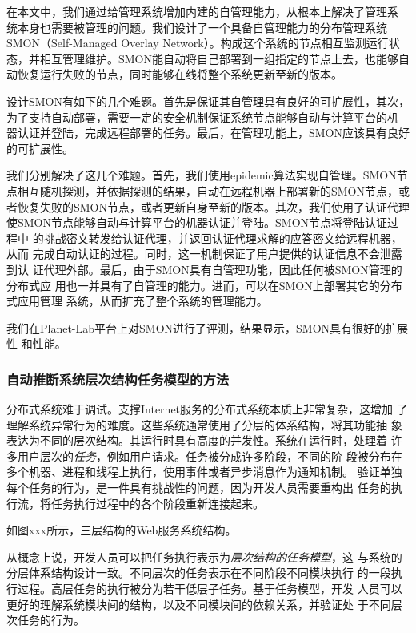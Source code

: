 在本文中，我们通过给管理系统增加内建的自管理能力，从根本上解决了管理系
统本身也需要被管理的问题。我们设计了一个具备自管理能力的分布管理系统
SMON（Self-Managed Overlay Network）。构成这个系统的节点相互监测运行状
态，并相互管理维护。SMON能自动将自己部署到一组指定的节点上去，也能够自
动恢复运行失败的节点，同时能够在线将整个系统更新至新的版本。

设计SMON有如下的几个难题。首先是保证其自管理具有良好的可扩展性，其次，
为了支持自动部署，需要一定的安全机制保证系统节点能够自动与计算平台的机
器认证并登陆，完成远程部署的任务。最后，在管理功能上，SMON应该具有良好
的可扩展性。

我们分别解决了这几个难题。首先，我们使用epidemic算法实现自管理。SMON节
点相互随机探测，并依据探测的结果，自动在远程机器上部署新的SMON节点，或
者恢复失败的SMON节点，或者更新自身至新的版本。其次，我们使用了认证代理
使SMON节点能够自动与计算平台的机器认证并登陆。SMON节点将登陆认证过程中
的挑战密文转发给认证代理，并返回认证代理求解的应答密文给远程机器，从而
完成自动认证的过程。同时，这一机制保证了用户提供的认证信息不会泄露到认
证代理外部。最后，由于SMON具有自管理功能，因此任何被SMON管理的分布式应
用也一并具有了自管理的能力。进而，可以在SMON上部署其它的分布式应用管理
系统，从而扩充了整个系统的管理能力。

我们在Planet-Lab平台上对SMON进行了评测，结果显示，SMON具有很好的扩展性
和性能。

\subsubsection*{自动推断系统层次结构任务模型的方法}

分布式系统难于调试。支撑Internet服务的分布式系统本质上非常复杂，这增加
了理解系统异常行为的难度。这些系统通常使用了分层的体系结构，将其功能抽
象表达为不同的层次结构。其运行时具有高度的并发性。系统在运行时，处理着
许多用户层次的\emph{任务}，例如用户请求。任务被分成许多阶段，不同的阶
段被分布在多个机器、进程和线程上执行，使用事件或者异步消息作为通知机制。
验证单独每个任务的行为，是一件具有挑战性的问题，因为开发人员需要重构出
任务的执行流，将任务执行过程中的各个阶段重新连接起来。

如图xxx所示，三层结构的Web服务系统结构。

从概念上说，开发人员可以把任务执行表示为\emph{层次结构的任务模型}，这
与系统的分层体系结构设计一致。不同层次的任务表示在不同阶段不同模块执行
的一段执行过程。高层任务的执行被分为若干低层子任务。基于任务模型，开发
人员可以更好的理解系统模块间的结构，以及不同模块间的依赖关系，并验证处
于不同层次任务的行为。

